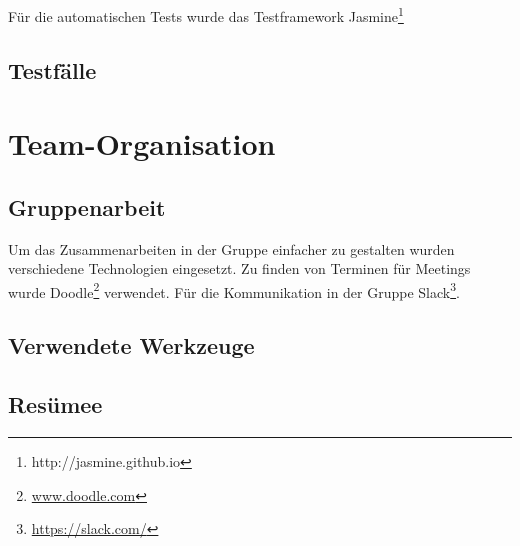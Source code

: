 Für die automatischen Tests wurde das Testframework Jasmine\footnote{http://jasmine.github.io}

\section{Testfälle}


\chapter{Team-Organisation}
\section{Gruppenarbeit}
Um das Zusammenarbeiten in der Gruppe einfacher zu gestalten wurden verschiedene Technologien eingesetzt.
Zu finden von Terminen für Meetings wurde Doodle\footnote{\url{www.doodle.com}}  verwendet. Für die Kommunikation in der Gruppe Slack\footnote{\url{https://slack.com/}}.
\section{Verwendete Werkzeuge}
\section{Resümee}
